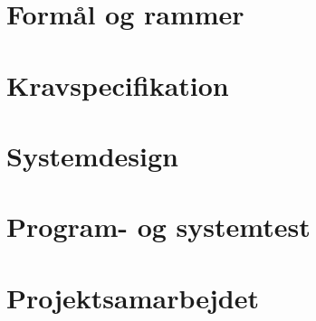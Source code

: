 \documentclass[12pt]{article}
\begin{document}
\section{Formål og rammer}
\label{sec:formal_og_rammer}

\section{Kravspecifikation}
\label{sec:kravspecifikation}

\section{Systemdesign}
\label{sec:systemdesign}

\section{Program- og systemtest}
\label{sec:program_og_systemtest}

\section{Projektsamarbejdet}
\label{sec:projektsamarbejdet}
\end{document}
